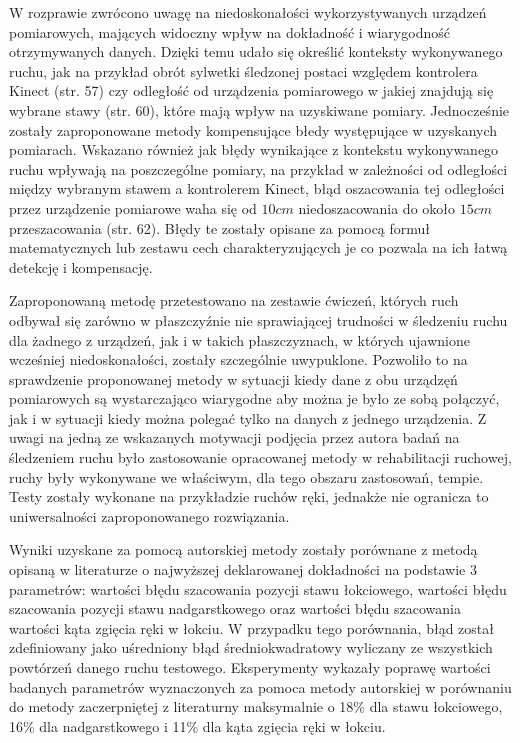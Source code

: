 \documentclass[10pt,a4paper]{article}
\begin{document}
\begin{FlushLeft}
W rozprawie zwrócono uwagę na niedoskonałości wykorzystywanych urządzeń pomiarowych, mających widoczny wpływ na dokładność i wiarygodność otrzymywanych danych. Dzięki temu udało się określić konteksty wykonywanego ruchu, jak na przykład obrót sylwetki śledzonej postaci względem kontrolera Kinect (str. 57) czy odległość od urządzenia pomiarowego w jakiej znajdują się wybrane stawy (str. 60), które mają wpływ na uzyskiwane pomiary. Jednocześnie zostały zaproponowane metody kompensujące błedy występujące w uzyskanych pomiarach. Wskazano również jak błędy wynikające z kontekstu wykonywanego ruchu wpływają na poszczególne pomiary, na przykład w zależności od odległości między wybranym stawem a kontrolerem Kinect, błąd oszacowania tej odległości przez urządzenie pomiarowe waha się od $10cm$ niedoszacowania do około $15cm$ przeszacowania (str. 62). Błędy te zostały opisane za pomocą formuł matematycznych lub zestawu cech charakteryzujących je co pozwala na ich łatwą detekcję i kompensację.

Zaproponowaną metodę przetestowano na zestawie ćwiczeń, których ruch odbywał się zarówno w płaszczyźnie nie sprawiającej trudności w śledzeniu ruchu dla żadnego z urządzeń, jak i w takich płaszczyznach, w których ujawnione wcześniej niedoskonałości, zostały szczególnie uwypuklone. Pozwoliło to na sprawdzenie proponowanej metody w sytuacji kiedy dane z obu urządzęń pomiarowych są wystarczająco wiarygodne aby można je było ze sobą połączyć, jak i w sytuacji kiedy można polegać tylko na danych z jednego urządzenia. Z uwagi na jedną ze wskazanych motywacji podjęcia przez autora badań na śledzeniem ruchu było zastosowanie opracowanej metody w rehabilitacji ruchowej, ruchy były wykonywane we właściwym, dla tego obszaru zastosowań, tempie. Testy zostały wykonane na przykładzie ruchów ręki, jednakże nie ogranicza to uniwersalności zaproponowanego rozwiązania.

Wyniki uzyskane za pomocą autorskiej metody zostały porównane z metodą opisaną w literaturze o najwyższej deklarowanej dokładności na podstawie 3 parametrów: wartości błędu szacowania pozycji stawu łokciowego, wartości błędu szacowania pozycji stawu nadgarstkowego oraz wartości błędu szacowania wartości kąta zgięcia ręki w łokciu. W przypadku tego porównania, błąd został zdefiniowany jako uśredniony błąd średniokwadratowy wyliczany ze wszystkich powtórzeń danego ruchu testowego. Eksperymenty wykazały poprawę wartości badanych parametrów wyznaczonych za pomoca metody autorskiej w porównaniu do metody zaczerpniętej z literaturny maksymalnie o 18\% dla stawu łokciowego, 16\% dla nadgarstkowego i 11\% dla kąta zgięcia ręki w łokciu.


\end{FlushLeft}
\end{document}
